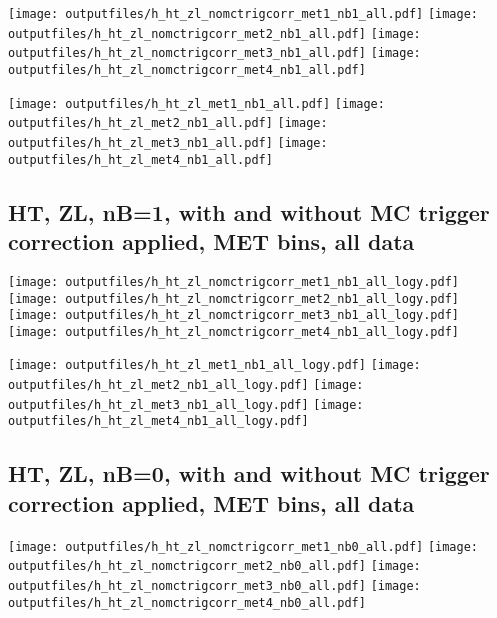 \documentclass[11pt]{article}
\begin{document}
    \noindent
     \texttt{[image: outputfiles/h\_ht\_zl\_nomctrigcorr\_met1\_nb1\_all.pdf]}
     \texttt{[image: outputfiles/h\_ht\_zl\_nomctrigcorr\_met2\_nb1\_all.pdf]}
     \texttt{[image: outputfiles/h\_ht\_zl\_nomctrigcorr\_met3\_nb1\_all.pdf]}
     \texttt{[image: outputfiles/h\_ht\_zl\_nomctrigcorr\_met4\_nb1\_all.pdf]}

    \noindent
     \texttt{[image: outputfiles/h\_ht\_zl\_met1\_nb1\_all.pdf]}
     \texttt{[image: outputfiles/h\_ht\_zl\_met2\_nb1\_all.pdf]}
     \texttt{[image: outputfiles/h\_ht\_zl\_met3\_nb1\_all.pdf]}
     \texttt{[image: outputfiles/h\_ht\_zl\_met4\_nb1\_all.pdf]}

   \clearpage
     \subsection{ HT, ZL, nB=1, with and without MC trigger correction applied, MET bins, all data}

    \noindent
     \texttt{[image: outputfiles/h\_ht\_zl\_nomctrigcorr\_met1\_nb1\_all\_logy.pdf]}
     \texttt{[image: outputfiles/h\_ht\_zl\_nomctrigcorr\_met2\_nb1\_all\_logy.pdf]}
     \texttt{[image: outputfiles/h\_ht\_zl\_nomctrigcorr\_met3\_nb1\_all\_logy.pdf]}
     \texttt{[image: outputfiles/h\_ht\_zl\_nomctrigcorr\_met4\_nb1\_all\_logy.pdf]}

    \noindent
     \texttt{[image: outputfiles/h\_ht\_zl\_met1\_nb1\_all\_logy.pdf]}
     \texttt{[image: outputfiles/h\_ht\_zl\_met2\_nb1\_all\_logy.pdf]}
     \texttt{[image: outputfiles/h\_ht\_zl\_met3\_nb1\_all\_logy.pdf]}
     \texttt{[image: outputfiles/h\_ht\_zl\_met4\_nb1\_all\_logy.pdf]}

   \clearpage
     \subsection{ HT, ZL, nB=0, with and without MC trigger correction applied, MET bins, all data}

    \noindent
     \texttt{[image: outputfiles/h\_ht\_zl\_nomctrigcorr\_met1\_nb0\_all.pdf]}
     \texttt{[image: outputfiles/h\_ht\_zl\_nomctrigcorr\_met2\_nb0\_all.pdf]}
     \texttt{[image: outputfiles/h\_ht\_zl\_nomctrigcorr\_met3\_nb0\_all.pdf]}
     \texttt{[image: outputfiles/h\_ht\_zl\_nomctrigcorr\_met4\_nb0\_all.pdf]}
\end{document}
